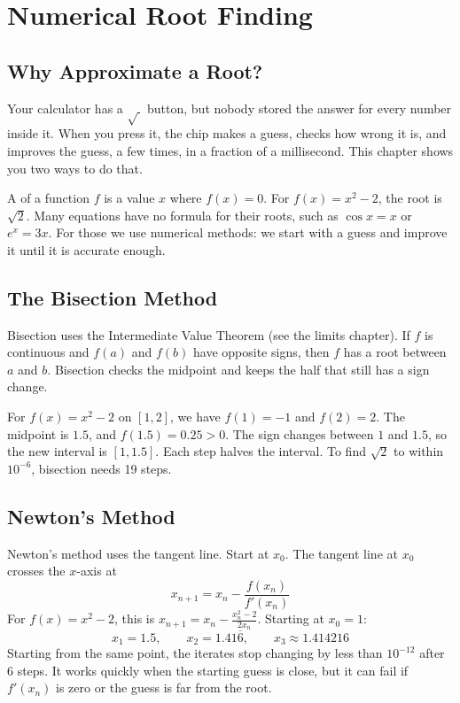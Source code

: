 \chapter{Numerical Root Finding}

\section{Why Approximate a Root?}
Your calculator has a $\sqrt{\ }$ button, but nobody stored the answer
for every number inside it. When you press it, the chip makes a guess, checks
how wrong it is, and improves the guess, a few times, in a fraction of a
millisecond. This chapter shows you two ways to do that.

A  of a function $f$ is a value $x$ where $f(x) = 0$. For
$f(x) = x^2 - 2$, the root is $\sqrt{2}$. Many equations have no formula for their
roots, such as $\cos x = x$ or $e^x = 3x$. For those we use numerical methods:
we start with a guess and improve it until it is accurate enough.

\section{The Bisection Method}
Bisection uses the Intermediate Value Theorem (see the limits chapter). If $f$ is
continuous and $f(a)$ and $f(b)$ have opposite signs, then $f$ has a root between
$a$ and $b$. Bisection checks the midpoint and keeps the half that still has a sign change.

For $f(x) = x^2 - 2$ on $[1, 2]$, we have $f(1) = -1$ and $f(2) = 2$. The
midpoint is $1.5$, and $f(1.5) = 0.25 > 0$. The sign changes between $1$ and
$1.5$, so the new interval is $[1, 1.5]$. Each step halves the interval. To
find $\sqrt{2}$ to within $10^{-6}$, bisection needs 19 steps.

\section{Newton's Method}
Newton's method uses the tangent line. Start at $x_0$. The tangent line at
$x_0$ crosses the $x$-axis at
$$x_{n+1} = x_n - \frac{f(x_n)}{f'(x_n)}$$
For $f(x) = x^2 - 2$, this is $x_{n+1} = x_n - \frac{x_n^2 - 2}{2x_n}$. Starting
at $x_0 = 1$:
$$x_1 = 1.5, \qquad x_2 = 1.41\overline{6}, \qquad x_3 \approx 1.414216$$
Starting from the same point, the iterates stop changing by less than $10^{-12}$
after 6 steps. It works quickly when the starting guess is close, but it can fail if
$f'(x_n)$ is zero or the guess is far from the root.

